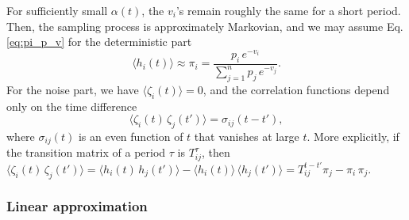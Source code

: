 \documentclass[reprint]{revtex4-1}
\begin{document}
For sufficiently small $\alpha(t)$,
the $v_i$'s remain roughly the same for a short period.
%
Then,
the sampling process is approximately Markovian, %
and we may assume Eq. \eqref{eq:pi_p_v}
for the deterministic part
%
\begin{equation}
  \langle h_i(t) \rangle
  \approx
  \pi_i
  =
  \frac{ p_i \, e^{-v_i} }
  { \sum_{j = 1}^n p_j \, e^{-v_j} }.
  \label{eq:h_ave}
\end{equation}
%
%
%
For the noise part, we have
$\langle \zeta_i(t) \rangle = 0$,
%
and the correlation functions
depend only on the time difference
%
\begin{equation}
  \langle \zeta_i(t) \, \zeta_j(t') \rangle
  =
  \sigma_{ij}(t - t'),
  \label{eq:zeta_zeta_correlation}
\end{equation}
%
where $\sigma_{ij}(t)$ is an even function of $t$
that vanishes at large $t$.
%
More explicitly,
if the transition matrix of a period $\tau$
is $T^\tau_{ij}$,
then
$
  \langle \zeta_i(t) \, \zeta_j(t') \rangle
  =
  \langle h_i(t) \, h_j(t') \rangle
  -
  \langle h_i(t) \rangle \, \langle h_j(t') \rangle
  =
  T^{t - t'}_{ij} \pi_j - \pi_i \, \pi_j.
$




\subsubsection{Linear approximation}
\end{document}
